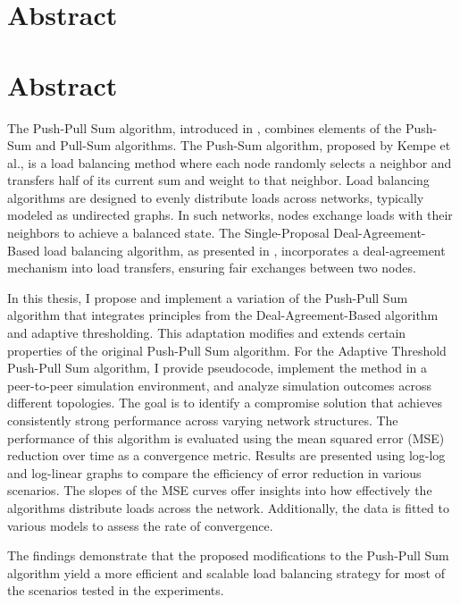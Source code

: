 \chapter*{Abstract}

\chapter*{Abstract}

The Push-Pull Sum algorithm, introduced in \cite{nugroho2023PushPullSumDataAg}, combines elements of the Push-Sum \cite{kempe2003gossipbasedComp} and Pull-Sum algorithms. The Push-Sum algorithm, proposed by Kempe et al., is a load balancing method where each node randomly selects a neighbor and transfers half of its current sum and weight to that neighbor. Load balancing algorithms are designed to evenly distribute loads across networks, typically modeled as undirected graphs. In such networks, nodes exchange loads with their neighbors to achieve a balanced state. The Single-Proposal Deal-Agreement-Based load balancing algorithm, as presented in \cite{Dinitz2023DAB}, incorporates a deal-agreement mechanism into load transfers, ensuring fair exchanges between two nodes.

In this thesis, I propose and implement a variation of the Push-Pull Sum algorithm that integrates principles from the Deal-Agreement-Based algorithm and adaptive thresholding. This adaptation modifies and extends certain properties of the original Push-Pull Sum algorithm. For the Adaptive Threshold Push-Pull Sum algorithm, I provide pseudocode, implement the method in a peer-to-peer simulation environment, and analyze simulation outcomes across different topologies. The goal is to identify a compromise solution that achieves consistently strong performance across varying network structures. The performance of this algorithm is evaluated using the mean squared error (MSE) reduction over time as a convergence metric. Results are presented using log-log and log-linear graphs to compare the efficiency of error reduction in various scenarios. The slopes of the MSE curves offer insights into how effectively the algorithms distribute loads across the network. Additionally, the data is fitted to various models to assess the rate of convergence.

The findings demonstrate that the proposed modifications to the Push-Pull Sum algorithm yield a more efficient and scalable load balancing strategy for most of the scenarios tested in the experiments.